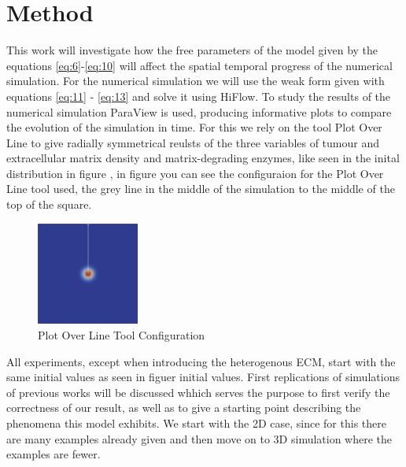 

\section{Method}


This work will investigate how the free parameters of the model given by the equations \ref{eq:6}-\ref{eq:10} will affect the spatial temporal progress of the numerical simulation. For the numerical simulation we will use the weak form given with equations \ref{eq:11} - \ref{eq:13} and solve it using HiFlow. To study the results of the numerical simulation ParaView is used, producing informative plots to compare the evolution of the simulation in time. For this we rely on the tool Plot Over Line to give radially symmetrical reulsts of the three variables of tumour and extracellular matrix density and matrix-degrading enzymes, like seen in the inital distribution in figure , in figure you can see the configuraion for the Plot Over Line tool used, the grey line in the middle of the simulation to the middle of the top of the square.\newline
\begin{figure}
    \centering
    \includegraphics[width=0.3\textwidth]{resources/images/plot_over_line_tool.png}
    \caption{Plot Over Line Tool Configuration}
    \label{fig:PlotOverLine}
\end{figure}
All experiments, except when introducing the heterogenous ECM, start with the same initial values as seen in figuer initial values.\newline 
First replications of simulations of previous works will be discussed whhich serves the purpose to first verify the correctness of our result, as well as to give a starting point describing the phenomena this model exhibits. We start with the 2D case, since for this there are many examples already given and then move on to 3D simulation where the examples are fewer. \newline
